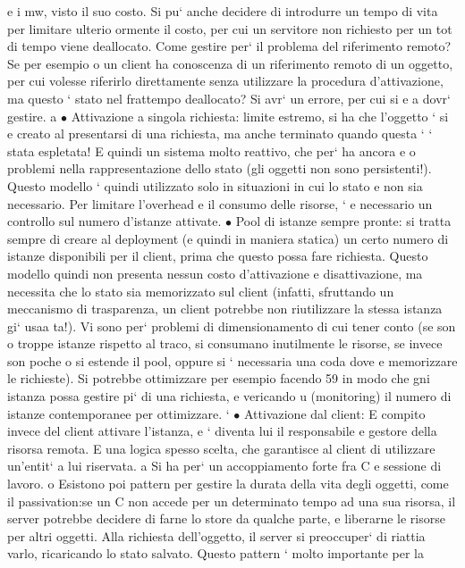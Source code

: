 \documentclass[a4paper,12pt]{article}
\begin{document}
e
i mw, visto il suo costo.
Si pu` anche decidere di introdurre un tempo di vita per limitare ulterio
ormente il costo, per cui un servitore non richiesto per un tot di tempo
viene deallocato.
Come gestire per` il problema del riferimento remoto? Se per esempio
o
un client ha conoscenza di un riferimento remoto di un oggetto, per cui
volesse riferirlo direttamente senza utilizzare la procedura d'attivazione,
ma questo ` stato nel frattempo deallocato? Si avr` un errore, per cui si
e
a
dovr` gestire.
a
$\bullet$ Attivazione a singola richiesta: limite estremo, si ha che l'oggetto ` si
e
creato al presentarsi di una richiesta, ma anche terminato quando questa
`
` stata espletata! E quindi un sistema molto reattivo, che per` ha ancora
e
o
problemi nella rappresentazione dello stato (gli oggetti non sono persistenti!). Questo modello ` quindi utilizzato solo
in situazioni in cui lo stato
e
non sia necessario. Per limitare l'overhead e il consumo delle risorse, `
e
necessario un controllo sul numero d'istanze attivate.
$\bullet$ Pool di istanze sempre pronte: si tratta sempre di creare al deployment
(e quindi in maniera statica) un certo numero di istanze disponibili per
il client, prima che questo possa fare richiesta. Questo modello quindi
non presenta nessun costo d'attivazione e disattivazione, ma necessita che
lo stato sia memorizzato sul client (infatti, sfruttando un meccanismo di
trasparenza, un client potrebbe non riutilizzare la stessa istanza gi` usaa
ta!). Vi sono per` problemi di dimensionamento di cui tener conto (se son
o
troppe istanze rispetto al traco, si consumano inutilmente le risorse, se
invece son poche o si estende il pool, oppure si ` necessaria una coda dove
e
memorizzare le richieste). Si potrebbe ottimizzare per esempio facendo
59
in modo che gni istanza possa gestire pi` di una richiesta, e vericando
u
(monitoring) il numero di istanze contemporanee per ottimizzare.
`
$\bullet$ Attivazione dal client: E compito invece del client attivare l'istanza, e
`
diventa lui il responsabile e gestore della risorsa remota. E una logica
spesso scelta, che garantisce al client di utilizzare un'entit` a lui riservata.
a
Si ha per` un accoppiamento forte fra C e sessione di lavoro.
o
Esistono poi pattern per gestire la durata della vita degli oggetti, come il passivation:se un C non accede per un
determinato tempo ad una sua risorsa, il
server potrebbe decidere di farne lo store da qualche parte, e liberarne le risorse
per altri oggetti. Alla richiesta dell'oggetto, il server si preoccuper` di riattia
varlo, ricaricando lo stato salvato. Questo pattern ` molto importante per la
\end{document}

